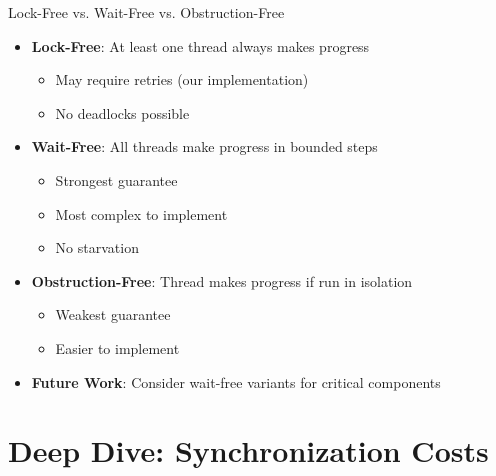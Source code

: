 \documentclass{beamer}
\begin{document}
\begin{frame}{Lock-Free vs. Wait-Free vs. Obstruction-Free}
\begin{itemize}
    \item \textbf{Lock-Free}: At least one thread always makes progress
    \begin{itemize}
        \item May require retries (our implementation)
        \item No deadlocks possible
    \end{itemize}
    \item \textbf{Wait-Free}: All threads make progress in bounded steps
    \begin{itemize}
        \item Strongest guarantee
        \item Most complex to implement
        \item No starvation
    \end{itemize}
    \item \textbf{Obstruction-Free}: Thread makes progress if run in isolation
    \begin{itemize}
        \item Weakest guarantee
        \item Easier to implement
    \end{itemize}
    \item \textbf{Future Work}: Consider wait-free variants for critical components
\end{itemize}
\end{frame}

\section{Deep Dive: Synchronization Costs}
\end{document}
